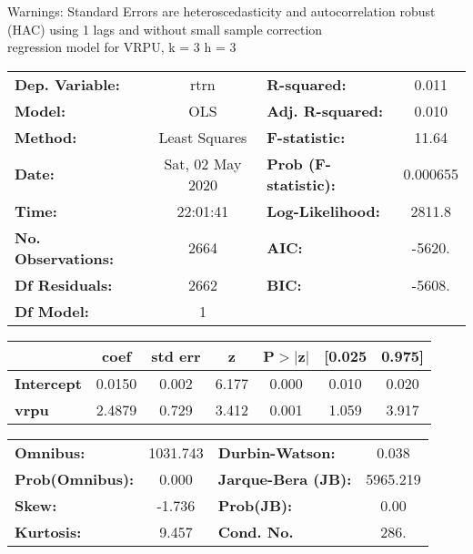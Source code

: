 Warnings: \newline
 [1] Standard Errors are heteroscedasticity and autocorrelation robust (HAC) using 1 lags and without small sample correction\\ 

regression model for VRPU, k = 3 h = 3\begin{center}
\begin{tabular}{lclc}
\toprule
\textbf{Dep. Variable:}    &       rtrn       & \textbf{  R-squared:         } &     0.011   \\
\textbf{Model:}            &       OLS        & \textbf{  Adj. R-squared:    } &     0.010   \\
\textbf{Method:}           &  Least Squares   & \textbf{  F-statistic:       } &     11.64   \\
\textbf{Date:}             & Sat, 02 May 2020 & \textbf{  Prob (F-statistic):} &  0.000655   \\
\textbf{Time:}             &     22:01:41     & \textbf{  Log-Likelihood:    } &    2811.8   \\
\textbf{No. Observations:} &        2664      & \textbf{  AIC:               } &    -5620.   \\
\textbf{Df Residuals:}     &        2662      & \textbf{  BIC:               } &    -5608.   \\
\textbf{Df Model:}         &           1      & \textbf{                     } &             \\
\bottomrule
\end{tabular}
\begin{tabular}{lcccccc}
                   & \textbf{coef} & \textbf{std err} & \textbf{z} & \textbf{P$> |$z$|$} & \textbf{[0.025} & \textbf{0.975]}  \\
\midrule
\textbf{Intercept} &       0.0150  &        0.002     &     6.177  &         0.000        &        0.010    &        0.020     \\
\textbf{vrpu}      &       2.4879  &        0.729     &     3.412  &         0.001        &        1.059    &        3.917     \\
\bottomrule
\end{tabular}
\begin{tabular}{lclc}
\textbf{Omnibus:}       & 1031.743 & \textbf{  Durbin-Watson:     } &    0.038  \\
\textbf{Prob(Omnibus):} &   0.000  & \textbf{  Jarque-Bera (JB):  } & 5965.219  \\
\textbf{Skew:}          &  -1.736  & \textbf{  Prob(JB):          } &     0.00  \\
\textbf{Kurtosis:}      &   9.457  & \textbf{  Cond. No.          } &     286.  \\
\bottomrule
\end{tabular}
\end{center}

